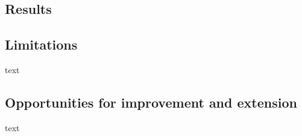 \subsection{Results}

\subsection{Limitations}

text

\subsection{Opportunities for improvement and extension}

text